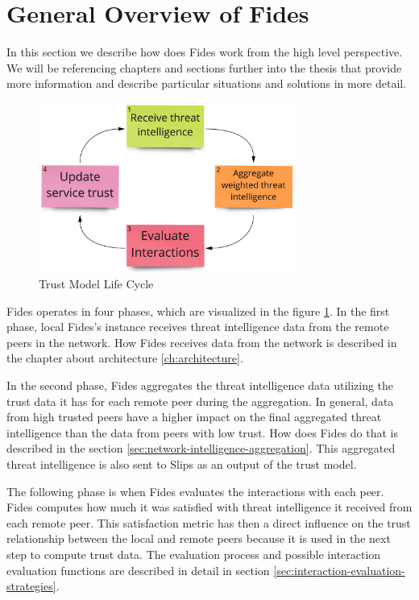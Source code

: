 \section{General Overview of Fides}
\label{sec:general-overview-of-fides}
In this section we describe how does Fides work from the high level perspective. We will be referencing chapters and sections further into the thesis that provide more information and describe particular situations and solutions in more detail.

\begin{figure}[ht!]
    \centering
    \includegraphics[width=0.75\textwidth]{assets/fides_lifecycle.jpeg}
    \caption{Trust Model Life Cycle}
    \label{fig:trust-model-life-cycle}
\end{figure}

Fides operates in four phases, which are visualized in the figure \ref{fig:trust-model-life-cycle}.
In the first phase, local Fides's instance receives threat intelligence data from the remote peers in the network. 
How Fides receives data from the network is described in the chapter about architecture \ref{ch:architecture}.

In the second phase, Fides aggregates the threat intelligence data utilizing the trust data it has for each remote peer during the aggregation.
In general, data from high trusted peers have a higher impact on the final aggregated threat intelligence than the data from peers with low trust.
How does Fides do that is described in the section  \ref{sec:network-intelligence-aggregation}.
This aggregated threat intelligence is also sent to Slips as an output of the trust model.

The following phase is when Fides evaluates the interactions with each peer.
Fides computes how much it was satisfied with threat intelligence it received from each remote peer.
This satisfaction metric has then a direct influence on the trust relationship between the local and remote peers because it is used in the next step to compute trust data. 
The evaluation process and possible interaction evaluation functions are described in detail in section \ref{sec:interaction-evaluation-strategies}.

